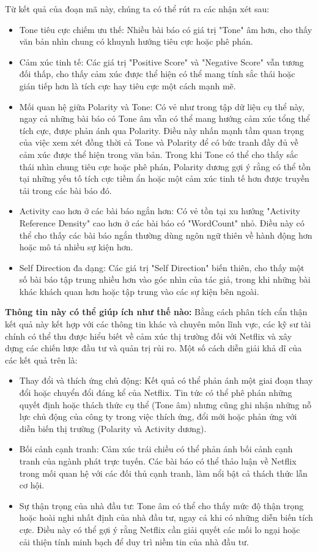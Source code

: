 Từ kết quả của đoạn mã này, chúng ta có thể rút ra các nhận xét sau:

\begin{itemize}
\item
  Tone tiêu cực chiếm ưu thế: Nhiều bài báo có giá trị "Tone" âm hơn, cho thấy văn bản nhìn chung có khuynh hướng tiêu cực hoặc phê phán.
\item
  Cảm xúc tinh tế: Các giá trị "Positive Score" và "Negative Score" vẫn tương đối thấp, cho thấy cảm xúc được thể hiện có thể mang tính sắc thái hoặc gián tiếp hơn là tích cực hay tiêu cực một cách mạnh mẽ.
\item
  Mối quan hệ giữa Polarity và Tone: Có vẻ như trong tập dữ liệu cụ thể này, ngay cả những bài báo có Tone âm vẫn có thể mang hướng cảm xúc tổng thể tích cực, được phản ánh qua Polarity. Điều này nhấn mạnh tầm quan trọng của việc xem xét đồng thời cả Tone và Polarity để có bức tranh đầy đủ về cảm xúc được thể hiện trong văn bản. Trong khi Tone có thể cho thấy sắc thái nhìn chung tiêu cực hoặc phê phán, Polarity dương gợi ý rằng có thể tồn tại những yếu tố tích cực tiềm ẩn hoặc một cảm xúc tinh tế hơn được truyền tải trong các bài báo đó.
\item
  Activity cao hơn ở các bài báo ngắn hơn: Có vẻ tồn tại xu hướng "Activity Reference Density" cao hơn ở các bài báo có "WordCount" nhỏ. Điều này có thể cho thấy các bài báo ngắn thường dùng ngôn ngữ thiên về hành động hơn hoặc mô tả nhiều sự kiện hơn.
\item
  Self Direction đa dạng: Các giá trị "Self Direction" biến thiên, cho thấy một số bài báo tập trung nhiều hơn vào góc nhìn của tác giả, trong khi những bài khác khách quan hơn hoặc tập trung vào các sự kiện bên ngoài.
\end{itemize}

\textbf{Thông tin này có thể giúp ích như thế nào:} Bằng cách phân tích cẩn thận kết quả này kết hợp với các thông tin khác và chuyên môn lĩnh vực, các kỹ sư tài chính có thể thu được hiểu biết về cảm xúc thị trường đối với Netflix và xây dựng các chiến lược đầu tư và quản trị rủi ro. Một số cách diễn giải khả dĩ của các kết quả trên là:

\begin{itemize}
\item
  Thay đổi và thích ứng chủ động: Kết quả có thể phản ánh một giai đoạn thay đổi hoặc chuyển đổi đáng kể của Netflix. Tin tức có thể phê phán những quyết định hoặc thách thức cụ thể (Tone âm) nhưng cũng ghi nhận những nỗ lực chủ động của công ty trong việc thích ứng, đổi mới hoặc phản ứng với diễn biến thị trường (Polarity và Activity dương).
\item
  Bối cảnh cạnh tranh: Cảm xúc trái chiều có thể phản ánh bối cảnh cạnh tranh của ngành phát trực tuyến. Các bài báo có thể thảo luận về Netflix trong mối quan hệ với các đối thủ cạnh tranh, làm nổi bật cả thách thức lẫn cơ hội.
\item
  Sự thận trọng của nhà đầu tư: Tone âm có thể cho thấy mức độ thận trọng hoặc hoài nghi nhất định của nhà đầu tư, ngay cả khi có những diễn biến tích cực. Điều này có thể gợi ý rằng Netflix cần giải quyết các mối lo ngại hoặc cải thiện tính minh bạch để duy trì niềm tin của nhà đầu tư.
\end{itemize}

